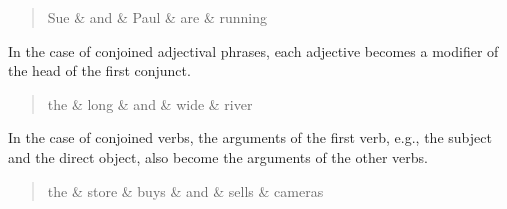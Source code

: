 \documentclass[10pt, a4paper]{article}
\begin{document}
\begin{quote}
\begin{center}
\begin{dependency}[column sep=0.2em, edge unit distance=2.25ex]
  \begin{deptext}
    Sue \& and \& Paul \& are \& running \\
  \end{deptext}
\end{dependency}
\end{center}
\end{quote}

In the case of conjoined adjectival phrases, each adjective becomes a modifier of the
head of the first conjunct.  

\begin{quote}
\begin{center}
 \begin{dependency}[column sep=0.2em, edge unit distance=2.25ex]
  \begin{deptext}
    the \& long \& and \& wide \& river \\
  \end{deptext}
\end{dependency}
\end{center}
\end{quote}

In the case of conjoined verbs, the arguments of the first verb, e.g., the subject and the direct object,
also become the arguments of the other verbs.

\begin{quote}
\begin{center}
\begin{dependency}[column sep=0.2em, edge unit distance=2.25ex]
  \begin{deptext}
    the \& store \& buys \& and \& sells  \& cameras \\
  \end{deptext}
\end{dependency}
\end{center}
\end{quote}
\end{document}
